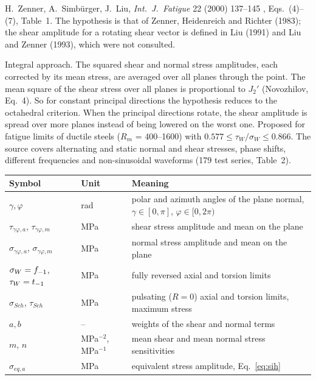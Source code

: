 \label{sheet:SIH}

 H.~Zenner, A.~Simb\"urger, J.~Liu, \emph{Int.\ J.\ Fatigue} 22 (2000) 137--145
\cite{zenner2000}, Eqs.~(4)--(7), Table~1. The hypothesis is that of Zenner, Heidenreich and
Richter (1983); the shear amplitude for a rotating shear vector is defined in Liu (1991) and Liu
and Zenner (1993), which were not consulted.

 Integral approach. The squared shear and normal stress amplitudes, each
corrected by its mean stress, are averaged over all planes through the point. The mean square of
the shear stress over all planes is proportional to $J_2'$ (Novozhilov, Eq.~4). So for constant
principal directions the hypothesis reduces to the octahedral criterion. When the principal
directions rotate, the shear amplitude is spread over more planes instead of being lowered on the
worst one. Proposed for fatigue limits of ductile steels ($R_m$ = 400--1600\MPa) with
$0.577\le\tau_W/\sigma_W\le0.866$. The source covers alternating and static normal and shear
stresses, phase shifts, different frequencies and non-sinusoidal waveforms (179 test series,
Table~2).

\begin{center}\small
\begin{tabular}{@{}llp{100mm}@{}}
\toprule
Symbol & Unit & Meaning\\\midrule
$\gamma,\varphi$ & rad & polar and azimuth angles of the plane normal, $\gamma\in[0,\pi]$, $\varphi\in[0,2\pi)$\\
$\tau_{\gamma\varphi,a}$, $\tau_{\gamma\varphi,m}$ & MPa & shear stress amplitude and mean on the plane\\
$\sigma_{\gamma\varphi,a}$, $\sigma_{\gamma\varphi,m}$ & MPa & normal stress amplitude and mean on the plane\\
$\sigma_W=f_{-1}$, $\tau_W=t_{-1}$ & MPa & fully reversed axial and torsion limits\\
$\sigma_{Sch}$, $\tau_{Sch}$ & MPa & pulsating ($R=0$) axial and torsion limits, maximum stress\\
$a,b$ & -- & weights of the shear and normal terms\\
$m$, $n$ & MPa$^{-2}$, MPa$^{-1}$ & mean shear and mean normal stress sensitivities\\
$\sigma_{eq,a}$ & MPa & equivalent stress amplitude, Eq.~\eqref{eq:sih}\\
\bottomrule
\end{tabular}
\end{center}

